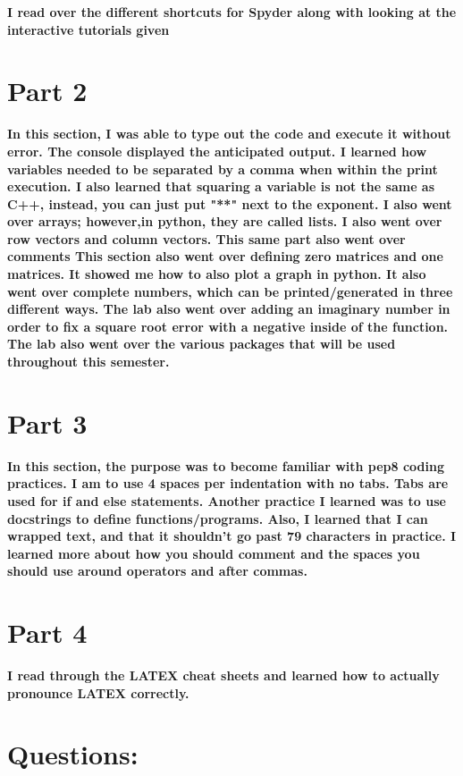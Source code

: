 \documentclass[12pt,a4paper]{article}
\begin{document}
\textbf{I read over the different shortcuts for Spyder along with looking at the interactive tutorials given} 

\section{Part 2}

\textbf{In this section, I was able to type out the code and execute it without error. The console displayed the anticipated output. I learned how variables needed to be separated by a comma when within the print execution. I also learned that squaring a variable is not the same as C++, instead, you can just put "**" next to the exponent. I also went over arrays; however,in python, they are called lists. I also went over row vectors and column vectors.
This same part also went over comments 
This section also went over defining zero matrices and one matrices. It showed me how to also plot a graph in python.
It also went over complete numbers, which can be printed/generated in three different ways. The lab also went over adding an imaginary number in order to fix a square root error with a negative inside of the function.
The lab also went over the various packages that will be used throughout this semester.}

\section{Part 3}

\textbf{In this section, the purpose was to become familiar with pep8 coding practices. I am to use 4 spaces per indentation with no tabs. Tabs are used for if and else statements. Another practice I learned was to use docstrings to define functions/programs. Also, I learned that I can wrapped text, and that it shouldn't go past 79 characters in practice.
I learned more about how you should comment and the spaces you should use around operators and after commas.
}
\section{Part 4}

\textbf{I read through the LATEX cheat sheets and learned how to actually pronounce LATEX correctly. }

\section{Questions:}
\end{document}
